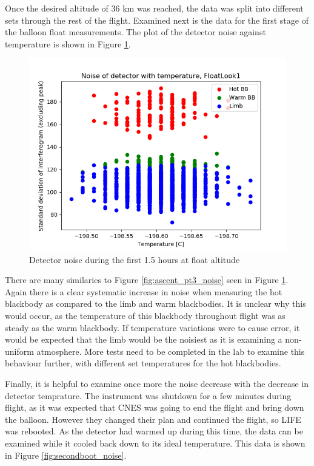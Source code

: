 Once the desired altitude of 36 km was reached, the data was split into different sets through the rest of the flight. Examined next is the data for the first stage of the balloon float measurements. The plot of the detector noise against temperature is shown in Figure \ref{fig:float_noise}.

\begin{figure}[ht]
\centering
  \includegraphics[width=0.8\linewidth]{mct_noise_temp_plots/FloatLook1_noisevtemp_invertedx_colours.png}
  \caption{Detector noise during the first 1.5 hours at float altitude}
  \label{fig:float_noise}
\end{figure}

There are many similaries to Figure \ref{fig:ascent_pt3_noise} seen in Figure \ref{fig:float_noise}. Again there is a clear systematic increase in noise when measuring the hot blackbody as compared to the limb and warm blackbodies. It is unclear why this would occur, as the temperature of this blackbody throughout flight was as steady as the warm blackbody. If temperature variations were to cause error, it would be expected that the limb would be the noisiest as it is examining a non-uniform atmosphere. More tests need to be completed in the lab to examine this behaviour further, with different set temperatures for the hot blackbodies.

Finally, it is helpful to examine once more the noise decrease with the decrease in detector temprature. The instrument was shutdown for a few minutes during flight, as it was expected that CNES was going to end the flight and bring down the balloon. However they changed their plan and continued the flight, so LIFE was rebooted. As the detector had warmed up during this time, the data can be examined while it cooled back down to its ideal temperature. This data is shown in Figure \ref{fig:secondboot_noise}.

